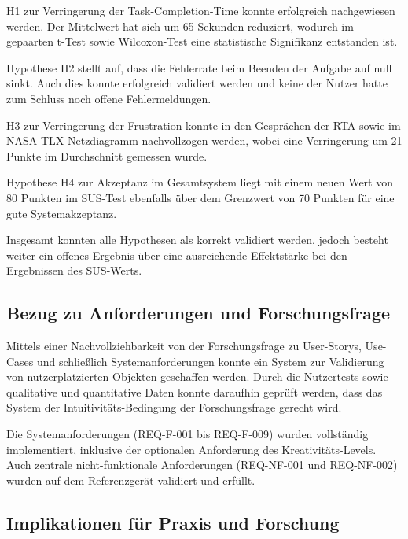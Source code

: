 H1 zur Verringerung der Task-Completion-Time konnte erfolgreich nachgewiesen werden. Der Mittelwert hat sich um 65 Sekunden reduziert, wodurch im gepaarten t-Test sowie Wilcoxon-Test eine statistische Signifikanz entstanden ist.

Hypothese H2 stellt auf, dass die Fehlerrate beim Beenden der Aufgabe auf null sinkt. Auch dies konnte erfolgreich validiert werden und keine der Nutzer hatte zum Schluss noch offene Fehlermeldungen.

H3 zur Verringerung der Frustration konnte in den Gesprächen der RTA sowie im NASA-TLX Netzdiagramm nachvollzogen werden, wobei eine Verringerung um 21 Punkte im Durchschnitt gemessen wurde.

Hypothese H4 zur Akzeptanz im Gesamtsystem liegt mit einem neuen Wert von 80 Punkten im SUS-Test ebenfalls über dem Grenzwert von 70 Punkten für eine gute Systemakzeptanz.

\medskip

Insgesamt konnten alle Hypothesen als korrekt validiert werden, jedoch besteht weiter ein offenes Ergebnis über eine ausreichende Effektstärke bei den Ergebnissen des SUS-Werts.

\subsection{Bezug zu Anforderungen und Forschungsfrage}


Mittels einer Nachvollziehbarkeit von der Forschungsfrage zu User-Storys, Use-Cases und schließlich Systemanforderungen konnte ein System zur Validierung von nutzerplatzierten Objekten geschaffen werden. Durch die Nutzertests sowie qualitative und quantitative Daten konnte daraufhin geprüft werden, dass das System der Intuitivitäts-Bedingung der Forschungsfrage gerecht wird.

Die Systemanforderungen (REQ-F-001 bis REQ-F-009) wurden vollständig implementiert, inklusive der optionalen Anforderung des Kreativitäts-Levels. Auch zentrale nicht-funktionale Anforderungen (REQ-NF-001 und REQ-NF-002) wurden auf dem Referenzgerät validiert und erfüllt.

\subsection{Implikationen für Praxis und Forschung}

